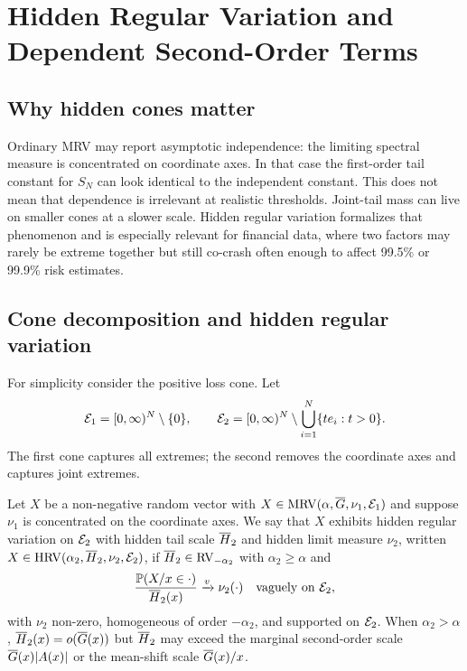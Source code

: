 \section{Hidden Regular Variation and Dependent Second-Order Terms}
\label{sec:hidden-rv}

\subsection{Why hidden cones matter}

Ordinary MRV may report asymptotic independence: the limiting spectral measure
is concentrated on coordinate axes. In that case the first-order tail constant
for \(S_N\) can look identical to the independent constant. This does not mean
that dependence is irrelevant at realistic thresholds. Joint-tail mass can live
on smaller cones at a slower scale. Hidden regular variation formalizes that
phenomenon and is especially relevant for financial data, where two factors may
rarely be extreme together but still co-crash often enough to affect 99.5\% or
99.9\% risk estimates.

\subsection{Cone decomposition and hidden regular variation}

For simplicity consider the positive loss cone. Let
\[
  \mathcal{E}_1=[0,\infty)^N\setminus\{0\}, \qquad
  \mathcal{E}_2=[0,\infty)^N\setminus\bigcup_{i=1}^N\{te_i:t>0\}.
\]
The first cone captures all extremes; the second removes the coordinate axes
and captures joint extremes.

\begin{definition}
\label{def:hrv}
Let $X$ be a non-negative random vector with $X\in\mathrm{MRV}(\alpha,\overline{G},\nu_1,\mathcal{E}_1)$
and suppose $\nu_1$ is concentrated on the coordinate axes. We say that $X$
exhibits hidden regular variation on $\mathcal{E}_2$ with hidden tail scale $\overline{H}_2$
and hidden limit measure $\nu_2$, written $X\in\mathrm{HRV}(\alpha_2,\overline{H}_2,\nu_2,\mathcal{E}_2)$,
if $\overline{H}_2\in\mathrm{RV}_{-\alpha_2}$ with $\alpha_2\ge\alpha$ and
\[
  \frac{\mathbb{P}(X/x\in\cdot)}{\overline{H}_2(x)}\xrightarrow{v}\nu_2(\cdot)
  \quad\text{vaguely on }\mathcal{E}_2,
\]
with $\nu_2$ non-zero, homogeneous of order $-\alpha_2$, and supported on
$\mathcal{E}_2$. When $\alpha_2>\alpha$, $\overline{H}_2(x)=o(\overline{G}(x))$ but $\overline{H}_2$ may exceed
the marginal second-order scale $\overline{G}(x)|A(x)|$ or the mean-shift scale
$\overline{G}(x)/x$.
\end{definition}

